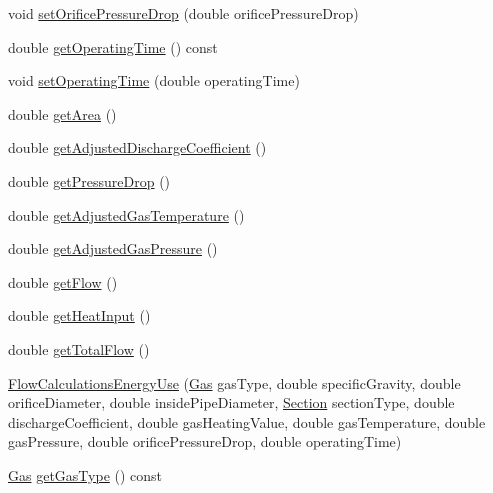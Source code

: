 \begin{DoxyCompactItemize}
void \hyperlink{class_flow_calculations_energy_use_ad4b324ecd8288d44c32d622bb26b1bff}{set\+Orifice\+Pressure\+Drop} (double orifice\+Pressure\+Drop)
\item 
double \hyperlink{class_flow_calculations_energy_use_ab44c6cad4825e30f5599f18fcbfbb873}{get\+Operating\+Time} () const
\item 
void \hyperlink{class_flow_calculations_energy_use_ac82800d533502c7836238dcab1f39fac}{set\+Operating\+Time} (double operating\+Time)
\item 
double \hyperlink{class_flow_calculations_energy_use_a2cfdefc20dcc3d1c5b7d3d12e66b67ee}{get\+Area} ()
\item 
double \hyperlink{class_flow_calculations_energy_use_a16444682b7c914d18d8456bf399b8bd2}{get\+Adjusted\+Discharge\+Coefficient} ()
\item 
double \hyperlink{class_flow_calculations_energy_use_a35aa80b2b9ea8769d56bf9e8d5837927}{get\+Pressure\+Drop} ()
\item 
double \hyperlink{class_flow_calculations_energy_use_a6efdcd6364e01577dda38dc49601df53}{get\+Adjusted\+Gas\+Temperature} ()
\item 
double \hyperlink{class_flow_calculations_energy_use_a8633821730568a5b1449914060c52aad}{get\+Adjusted\+Gas\+Pressure} ()
\item 
double \hyperlink{class_flow_calculations_energy_use_a6b892e984bd09e821cb642f8f8efd221}{get\+Flow} ()
\item 
double \hyperlink{class_flow_calculations_energy_use_af2d2196911d4784d72b14dff83295b19}{get\+Heat\+Input} ()
\item 
double \hyperlink{class_flow_calculations_energy_use_a154ce8f8307b443366b99719987dd725}{get\+Total\+Flow} ()
\item 
\hyperlink{class_flow_calculations_energy_use_a37514554d3cb04764b27d648966de471}{Flow\+Calculations\+Energy\+Use} (\hyperlink{class_flow_calculations_energy_use_a840d5a836e7b05d6791b79bace4440f2}{Gas} gas\+Type, double specific\+Gravity, double orifice\+Diameter, double inside\+Pipe\+Diameter, \hyperlink{class_flow_calculations_energy_use_afbabab0da698748de91369a5dfc7662a}{Section} section\+Type, double discharge\+Coefficient, double gas\+Heating\+Value, double gas\+Temperature, double gas\+Pressure, double orifice\+Pressure\+Drop, double operating\+Time)
\item 
\hyperlink{class_flow_calculations_energy_use_a840d5a836e7b05d6791b79bace4440f2}{Gas} \hyperlink{class_flow_calculations_energy_use_a04df0a0c655c4aef3d5a4539d57fec2e}{get\+Gas\+Type} () const

\end{DoxyCompactItemize}

